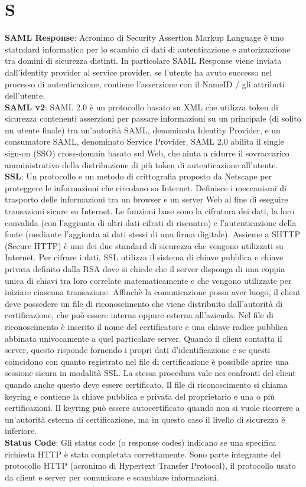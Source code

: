 \section{S}

\textbf{SAML Response}: Acronimo di Security Assertion Markup Language è uno statndard informatico per lo scambio di dati di autenticazione e autorizzazione tra domini di sicurezza distinti. In particolare SAML Response viene inviata dall'identity provider al service provider, se l'utente ha avuto successo nel processo di autenticazione, contiene l'asserzione con il NameID / gli attributi dell'utente.\\
\textbf{SAML v2}: SAML 2.0 è un protocollo basato su XML che utilizza token di sicurezza contenenti asserzioni per passare informazioni su un principale (di solito un utente finale) tra un'autorità SAML, denominata Identity Provider, e un consumatore SAML, denominato Service Provider. SAML 2.0 abilita il single sign-on (SSO) cross-domain basato sul Web, che aiuta a ridurre il sovraccarico amministrativo della distribuzione di più token di autenticazione all'utente.\\
\textbf{SSL}: Un protocollo e un metodo di crittografia proposto da Netscape per proteggere le informazioni che circolano su Internet. 
Definisce i meccanismi di trasporto delle informazioni tra un browser e un server Web al fine di eseguire transazioni sicure su Internet. 
Le funzioni base sono la cifratura dei dati, la loro convalida (con l'aggiunta di altri dati cifrati di riscontro) e l'autenticazione della 
fonte (mediante l'aggiunta ai dati stessi di una firma digitale). Assieme a SHTTP (Secure HTTP) è uno dei due standard di sicurezza che vengono 
utilizzati su Internet. Per cifrare i dati, SSL utilizza il sistema di chiave pubblica e chiave privata definito dalla RSA dove si chiede che il server 
disponga di una coppia unica di chiavi tra loro correlate matematicamente e che vengono utilizzate per iniziare ciascuna transazione. 
Affinchè la comunicazione possa aver luogo, il client deve possedere un file di riconoscimento che viene distribuito dall'autorità di certificazione, 
che può essere interna oppure esterna all'azienda. Nel file di riconoscimento è inserito il nome del certificatore e una chiave radice pubblica abbinata 
univocamente a quel particolare server. Quando il client contatta il server, questo risponde fornendo i propri dati d'identificazione e se questi 
coincidono con quanto registrato nel file di certificazione è possibile aprire una sessione sicura in modalità SSL. La stessa procedura vale nei 
confronti del client quando anche questo deve essere certificato. Il file di riconoscimento si chiama keyring e contiene la chiave pubblica e privata 
del proprietario e una o più certificazioni. Il keyring può essere autocertificato quando non si vuole ricorrere a un'autorità esterna di certificazione, 
ma in questo caso il livello di sicurezza è inferiore.\\
\textbf{Status Code}: Gli status code (o response codes) indicano se una specifica richiesta HTTP è stata completata correttamente. Sono parte integrante del protocollo HTTP (acronimo di Hypertext Transfer Protocol), il protocollo usato da client e server per comunicare e scambiare informazioni.\\
